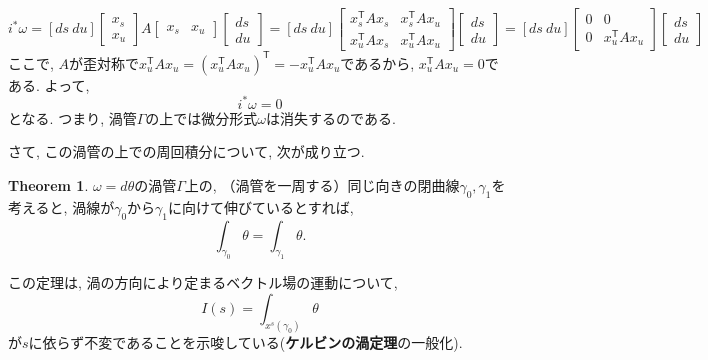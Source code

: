 \documentclass[a4paper]{ujarticle}
\numberwithin{equation}{section}
\theoremstyle{definition}
\newtheorem{theorem}{Theorem}
\begin{document}
    \[
        i^{*} \omega = [ds \ du] 
        \begin{bmatrix}
            x_s\\
            x_u
        \end{bmatrix}
        A
        \begin{bmatrix}
            x_s &x_u 
        \end{bmatrix}
        \begin{bmatrix}
            ds\\
            du
        \end{bmatrix}
        = [ds \ du]
        \begin{bmatrix}
            x_s^{\mathsf{T}} A x_s &x_s^{\mathsf{T}} A x_u \\
            x_u^{\mathsf{T}} A x_s &x_u^{\mathsf{T}} A x_u
        \end{bmatrix}
        \begin{bmatrix}
            ds\\
            du
        \end{bmatrix}
        = [ds \ du]
        \begin{bmatrix}
            0 &0 \\
            0 &x_u^{\mathsf{T}} A x_u
        \end{bmatrix}
        \begin{bmatrix}
            ds\\
            du
        \end{bmatrix}
    \]
    ここで, $A$が歪対称で$x_u^{\mathsf{T}} A x_u = (x_u^{\mathsf{T}} A x_u)^{\mathsf{T}} = - x_u^{\mathsf{T}} A x_u$であるから,
    $x_u^{\mathsf{T}} A x_u = 0$である.
    よって, 
    \[
        i^{*} \omega = 0
    \]
    となる.
    つまり, 渦管$\Gamma$の上では微分形式$\omega$は消失するのである.

    さて, この渦管の上での周回積分について, 次が成り立つ. 
    \begin{theorem} \label{Kl}
        $\omega = d \theta$の渦管$\Gamma$上の, 
        （渦管を一周する）同じ向きの閉曲線$\gamma_0, \gamma_1$を考えると,
        渦線が$\gamma_0$から$\gamma_1$に向けて伸びているとすれば,
        \begin{equation} \label{uzu}
            \int_{\gamma_0} \theta = \int_{\gamma_1} \theta.
        \end{equation}
    \end{theorem}

    この定理は, 渦の方向により定まるベクトル場の運動について, 
    \begin{equation} \label{inv}
        I(s) = \int_{x^{s}(\gamma_0)} \theta
    \end{equation}
    が$s$に依らず不変であることを示唆している(\textbf{ケルビンの渦定理}の一般化).
\end{document}

